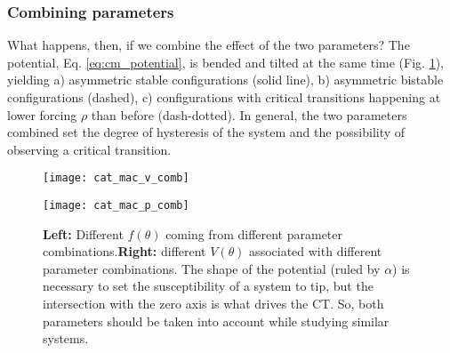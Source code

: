 \tocless\subsubsection{Combining parameters}
What happens, then, if we combine the effect of the two parameters? The potential, Eq. \ref{eq:cm_potential}, is bended and tilted at the same time (Fig. \ref{fig:cm_comb}), yielding a) asymmetric stable configurations (solid line), b) asymmetric bistable configurations (dashed), c) configurations with critical transitions happening at lower forcing $\rho$ than before (dash-dotted). In general, the two parameters combined set the degree of hysteresis of the system and the possibility of observing a critical transition.\\



\begin{figure}[h]
	\centering
	\begin{minipage}[c]{0.48\textwidth}
		\texttt{[image: cat\_mac\_v\_comb]}
		\renewcommand{\figurename}{Fig.}
	\end{minipage}
	\hspace{0.05cm}
	\begin{minipage}[c]{0.48\textwidth}
		\texttt{[image: cat\_mac\_p\_comb]}
		\renewcommand{\figurename}{Fig.}
	\end{minipage} 
	\caption{\small \textbf{Left:} Different $f(\theta)$ coming from different parameter combinations.\textbf{Right:} different $V(\theta)$ associated with different parameter combinations. The shape of the potential (ruled by $\alpha$) is necessary to set the susceptibility of a system to tip, but the intersection with the zero axis is what drives the \gls{CT}. So, both parameters should be taken into account while studying similar systems. }
	\label{fig:cm_comb}
\end{figure}



